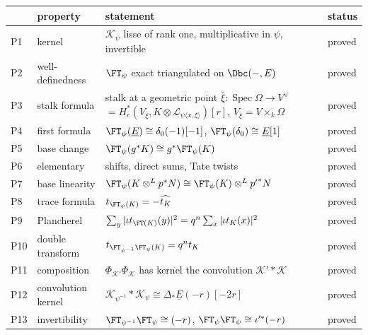 \documentclass[11pt]{article}
\theoremstyle{plain}
\theoremstyle{definition}
\DeclareMathOperator{\Spec}{Spec}
\begin{document}
\begin{center}
\footnotesize
\begin{tabular}{@{}p{0.6cm}p{3.4cm}p{9.0cm}p{1.7cm}@{}}
\hline
& property & statement & status \\
\hline
P1 & kernel & $\mathcal K_\psi$ lisse of rank one, multiplicative in $\psi$, invertible & proved \\
P2 & well-definedness & $\FT_\psi$ exact triangulated on $\Dbc(-,E)$ & proved \\
P3 & stalk formula & stalk at a geometric point $\bar\xi:\Spec\Omega\to V^\vee$ $=H^*_c(V_{\bar\xi},K\otimes\mathcal L_{\psi\langle x,\xi\rangle})[r]$, $V_{\bar\xi}=V\times_k\Omega$ & proved \\
P4 & first formula & $\FT_\psi(\underline{E})\cong\delta_0(-1)[-1]$, $\FT_\psi(\delta_0)\cong\underline{E}[1]$ & proved \\
P5 & base change & $\FT_\psi(g^*K)\cong g^*\FT_\psi(K)$ & proved \\
P6 & elementary & shifts, direct sums, Tate twists & proved \\
P7 & base linearity & $\FT_\psi(K\otimes^Lp^*N)\cong\FT_\psi(K)\otimes^L{p'}^*N$ & proved \\
P8 & trace formula & $t_{\FT_\psi(K)}=-\widehat{t_K}$ & proved \\
P9 & Plancherel & $\sum_y|\iota t_{\FT(K)}(y)|^2=q^n\sum_x|\iota t_K(x)|^2$ & proved \\
P10 & double transform & $t_{\FT_{\psi^{-1}}\FT_\psi(K)}=q^nt_K$ & proved \\
P11 & composition & $\Phi_{\mathcal K'}\Phi_{\mathcal K}$ has kernel the convolution $\mathcal K'\ast\mathcal K$ & proved \\
P12 & convolution kernel & $\mathcal K_{\psi^{-1}}\ast\mathcal K_\psi\cong\Delta_*\underline{E}(-r)[-2r]$ & proved \\
P13 & invertibility & $\FT_{\psi^{-1}}\FT_\psi\cong(-r)$, $\FT_\psi\FT_\psi\cong\iota'^*(-r)$ & proved \\
\hline
\end{tabular}
\end{center}
\end{document}
